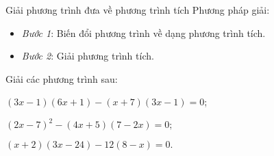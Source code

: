 {\begin{vd}
{\begin{listEX}[2]
		
	\end{listEX}
	}
\end{vd}

\begin{dang}{Giải phương trình đưa về phương trình tích}
Phương pháp giải:
\begin{itemize}
	\item \textit{Bước 1}: Biến đổi phương trình về dạng phương trình tích.
	\item \textit{Bước 2}: Giải phương trình tích.
	\end{itemize}
\end{dang}

\begin{vd}%
	 Giải các phương trình sau:
	\begin{listEX}[2]
		\item $(3x - 1)(6x + 1) - (x + 7)(3x - 1) = 0$;
		\item $(2x - 7)^2 - (4x + 5)(7 - 2x) = 0;$
		\item $(x + 2)(3x - 24)- 12(8 - x) = 0.$
	\end{listEX}
	\loigiai
	{
		}
\end{vd}}
